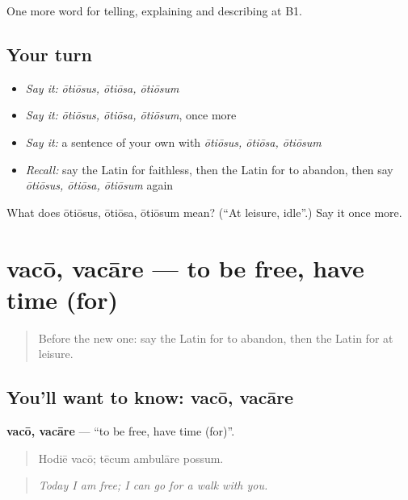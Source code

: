 \begin{grammarlens}[title={What you've built}]
One more word for telling, explaining and describing at B1.
\end{grammarlens}

\subsection*{Your turn}
\begin{itemize}
\raggedright
  \item \emph{Say it:} \emph{ōtiōsus, ōtiōsa, ōtiōsum}
  \item \emph{Say it:} \emph{ōtiōsus, ōtiōsa, ōtiōsum}, once more
  \item \emph{Say it:} a sentence of your own with \emph{ōtiōsus, ōtiōsa, ōtiōsum}
  \item \emph{Recall:} say the Latin for faithless, then the Latin for to abandon, then say \emph{ōtiōsus, ōtiōsa, ōtiōsum} again
\end{itemize}

\begin{tcolorbox}[breakable,colback=teal!4,colframe=teal!35!black,title={Before you move on}]
What does ōtiōsus, ōtiōsa, ōtiōsum mean? (\textquotedblleft{}At leisure, idle\textquotedblright{}.) Say it once more.
\end{tcolorbox}
\section[vacō, vacāre]{vacō, vacāre — to be free, have time (for)}

\label{lesson:LA-C538-vaco}



\begin{quote}
Before the new one: say the Latin for to abandon, then the Latin for at leisure.
\end{quote}

\subsection*{You'll want to know: vacō, vacāre}
\textbf{vacō, vacāre} — \textquotedblleft{}to be free, have time (for)\textquotedblright{}.

\begin{quote}
Hodiē vacō; tēcum ambulāre possum.
\end{quote}

\begin{quote}
\emph{Today I am free; I can go for a walk with you.}
\end{quote}

